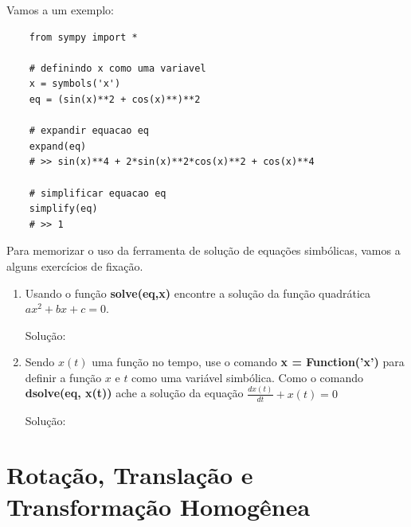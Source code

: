 Vamos a um exemplo:

\begin{lstlisting}
    from sympy import *

    # definindo x como uma variavel
    x = symbols('x')
    eq = (sin(x)**2 + cos(x)**)**2

    # expandir equacao eq
    expand(eq)
    # >> sin(x)**4 + 2*sin(x)**2*cos(x)**2 + cos(x)**4

    # simplificar equacao eq
    simplify(eq)
    # >> 1

\end{lstlisting}

Para memorizar o uso da ferramenta de solução de equações simbólicas, vamos a alguns exercícios de fixação.

\begin{shortbox}
    \begin{enumerate}
        \item  Usando o função \textbf{solve(eq,x)} encontre a solução da função quadrática $ax^2+bx+c=0$.
        \begin{center}
            Solução:

\end{center}

    \item Sendo $x(t)$ uma função no tempo, use o comando \textbf{x = Function('x')} para definir a função $x$ e $t$ como 
    uma variável simbólica. Como o comando \textbf{dsolve(eq, x(t))} ache a solução da equação $\displaystyle\frac{dx(t)}{dt}+x(t)=0$
    \begin{center}
        Solução:

\end{center}

\end{enumerate}
\end{shortbox}

\section{Rotação, Translação e Transformação Homogênea}\label{rotacao}
 
